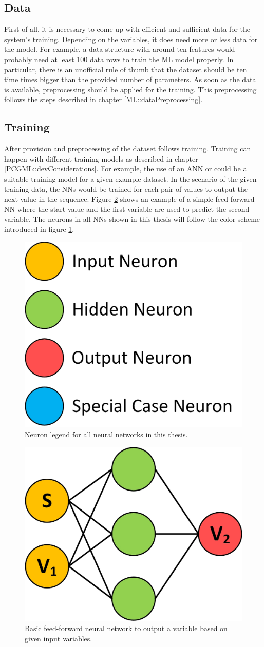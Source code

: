 \documentclass[MGS,Master,english]{twbook}%
\begin{document}
\subsection{Data}
First of all, it is necessary to come up with efficient and sufficient data for the system’s training. Depending on the variables, it does need more or less data for the model. For example, a data structure with around ten features would probably need at least 100 data rows to train the ML model properly. In particular, there is an unofficial rule of thumb that the dataset should be ten time times bigger than the provided number of parameters. As soon as the data is available, preprocessing should be applied for the training. This preprocessing follows the steps described in chapter \ref{ML::dataPreprocessing}.


\subsection{Training}
After provision and preprocessing of the dataset follows training. Training can happen with different training models as described in chapter \ref{PCGML::devConsiderations}. For example, the use of an ANN or could be a suitable training model for a given example dataset. In the scenario of the given training data, the \acp{NN} would be trained for each pair of values to output the next value in the sequence. Figure \ref{fig::PCGML::devExample::NNbasic} shows an example of a simple feed-forward \ac{NN} where the start value and the first variable are used to predict the second variable. The neurons in all \acp{NN} shown in this thesis will follow the color scheme introduced in figure \ref{fig::neuron_legend}. 
\begin{figure}[!htbp]
	\centering
	\includegraphics[width=0.3\linewidth]{PICs/NNs/neurons_legend.jpg}
	\caption{Neuron legend for all neural networks in this thesis.}\label{fig::neuron_legend}
\end{figure}
\begin{figure}[!htbp]
	\centering
	\includegraphics[width=0.3\linewidth]{PICs/NNs/PCGML_development_example_NN_basic}
	\caption{Basic feed-forward neural network to output a variable based on given input variables.}\label{fig::PCGML::devExample::NNbasic}
\end{figure}
\end{document}
